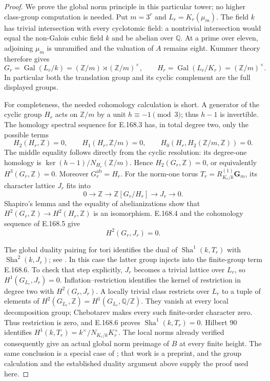 \begin{proof}
We prove the global norm principle in this particular tower;
no higher class-group computation is needed.  Put \(m=3^r\)
and \(L_r=K_r(\mu_m)\).  The field \(k\) has trivial
intersection with every cyclotomic field: a nontrivial intersection
would equal the non-Galois cubic field \(k\) and be abelian over
\(\mathbb Q\).  At a prime over eleven, adjoining \(\mu_m\) is
unramified and the valuation of \(A\) remains eight.  Kummer
theory therefore gives
\[
 G_r=\operatorname{Gal}(L_r/k)
       =(\mathbb Z/m)\rtimes(\mathbb Z/m)^\times,
 \qquad H_r=\operatorname{Gal}(L_r/K_r)=(\mathbb Z/m)^\times.
\tag{E.168.3}
\]
In particular both the translation group and its cyclic complement
are the full displayed groups.

For completeness, the needed cohomology calculation is short.
A generator of the cyclic group \(H_r\) acts on \(\mathbb Z/m\)
by a unit \(h\equiv-1\pmod3\); thus \(h-1\) is invertible.
The homology spectral sequence for E.168.3 has, in total degree
two, only the possible terms
\[
 H_2(H_r,\mathbb Z)=0,\qquad
 H_1(H_r,\mathbb Z/m)=0,\qquad
 H_0(H_r,H_2(\mathbb Z/m,\mathbb Z))=0.
\tag{E.168.4}
\]
The middle equality follows directly from the cyclic resolution:
its degree-one homology is \(\ker(h-1)/N_{H_r}(\mathbb Z/m)\).
Hence \(H_2(G_r,\mathbb Z)=0\), or equivalently
\(H^3(G_r,\mathbb Z)=0\).  Moreover \(G_r^{\mathrm{ab}}=H_r\).
For the norm-one torus \(T_r=R^{(1)}_{K_r/k}\mathbf G_m\),
its character lattice \(J_r\) fits into
\[
 0\to\mathbb Z\to\mathbb Z[G_r/H_r]\to J_r\to0.
\tag{E.168.5}
\]
Shapiro's lemma and the equality of abelianizations show that
\(H^2(G_r,\mathbb Z)\to H^2(H_r,\mathbb Z)\) is an isomorphism.
E.168.4 and the cohomology sequence of E.168.5 give
\[
                         H^2(G_r,J_r)=0.
\tag{E.168.6}
\]

The global duality pairing for tori identifies the dual of
\(\operatorname{Sha}^1(k,T_r)\) with \(\operatorname{Sha}^2(k,J_r)\); see
\cite[I, p.~66, following Corollary 4.21; II, Theorem 4.6 and
Corollary 4.7, pp.~191--192]{CohMilneADT}.
In this case the latter group injects into the finite-group term
E.168.6.  To check that step explicitly, \(J_r\) becomes a
trivial lattice over \(L_r\), so
\(H^1(G_{L_r},J_r)=0\).  Inflation--restriction identifies
the kernel of restriction in degree two with
\(H^2(G_r,J_r)\).  A locally trivial class restricts over
\(L_r\) to a tuple of elements of
\(H^2(G_{L_r},\mathbb Z)=H^1(G_{L_r},\mathbb Q/\mathbb Z)\).
They vanish at every local decomposition group; Chebotarev makes
every such finite-order character zero.  Thus restriction is zero,
and E.168.6 proves \(\operatorname{Sha}^1(k,T_r)=0\).
Hilbert 90 identifies \(H^1(k,T_r)=k^\times/N_{K_r/k}K_r^\times\).
The local norms already verified consequently give an actual
global norm preimage of \(B\) at every finite height.
The same conclusion is a special case of
\cite[Theorems 1.2 and 3.2, pp.~2 and 6]{LitHoshiYamasaki2025Metacyclic};
that work is a preprint, and the group calculation and the
established duality argument above supply the proof used here.


\end{proof}
